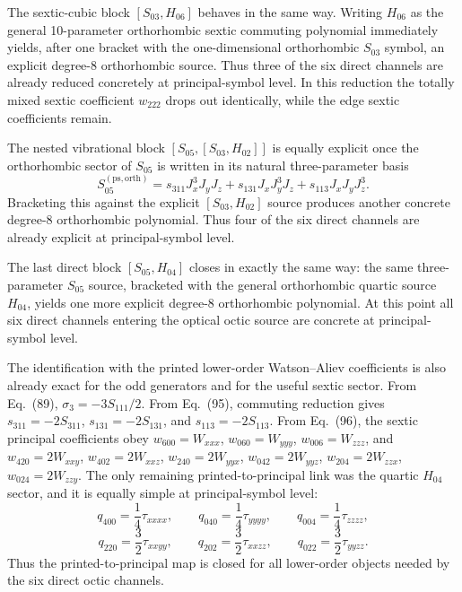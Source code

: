 \documentclass[aip,jcp,reprint,floatfix]{revtex4-2}
\begin{document}
The sextic-cubic block \([S_{03},H_{06}]\) behaves in the same way.  Writing
\(H_{06}\) as the general 10-parameter orthorhombic sextic commuting
polynomial immediately yields, after one bracket with the one-dimensional
orthorhombic \(S_{03}\) symbol, an explicit degree-8 orthorhombic source.
Thus three of the six direct channels are already reduced concretely at
principal-symbol level. In this reduction the totally mixed sextic coefficient
\(w_{222}\) drops out identically, while the edge sextic coefficients remain.

The nested vibrational block \([S_{05},[S_{03},H_{02}]]\) is equally explicit
once the orthorhombic sector of \(S_{05}\) is written in its natural
three-parameter basis
\[
S_{05}^{(\mathrm{ps},\mathrm{orth})}
=
s_{311}J_x^3J_yJ_z+s_{131}J_xJ_y^3J_z+s_{113}J_xJ_yJ_z^3.
\]
Bracketing this against the explicit \([S_{03},H_{02}]\) source produces
another concrete degree-8 orthorhombic polynomial. Thus four of the six direct
channels are already explicit at principal-symbol level.

The last direct block \([S_{05},H_{04}]\) closes in exactly the same way:
the same three-parameter \(S_{05}\) source, bracketed with the general
orthorhombic quartic source \(H_{04}\), yields one more explicit degree-8
orthorhombic polynomial. At this point all six direct channels entering the
optical octic source are concrete at principal-symbol level.

The identification with the printed lower-order Watson--Aliev coefficients is
also already exact for the odd generators and for the useful sextic sector.
From Eq.~(89), \(\sigma_3=-3S_{111}/2\). From Eq.~(95), commuting reduction
gives \(s_{311}=-2S_{311}\), \(s_{131}=-2S_{131}\), and
\(s_{113}=-2S_{113}\). From Eq.~(96), the sextic principal coefficients obey
\(w_{600}=W_{xxx}\), \(w_{060}=W_{yyy}\), \(w_{006}=W_{zzz}\), and
\(w_{420}=2W_{xxy}\), \(w_{402}=2W_{xxz}\), \(w_{240}=2W_{yyx}\),
\(w_{042}=2W_{yyz}\), \(w_{204}=2W_{zzx}\), \(w_{024}=2W_{zzy}\). The only
remaining printed-to-principal link was the quartic \(H_{04}\) sector, and it
is equally simple at principal-symbol level:
\[
q_{400}=\frac14\tau_{xxxx},\qquad
q_{040}=\frac14\tau_{yyyy},\qquad
q_{004}=\frac14\tau_{zzzz},
\]
\[
q_{220}=\frac32\tau_{xxyy},\qquad
q_{202}=\frac32\tau_{xxzz},\qquad
q_{022}=\frac32\tau_{yyzz}.
\]
Thus the printed-to-principal map is closed for all lower-order objects needed
by the six direct octic channels.
\end{document}
